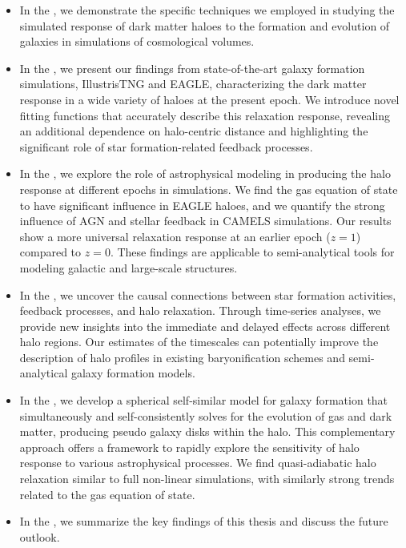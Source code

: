 \begin{itemize}
    \item In the ,  we demonstrate the specific techniques we employed in studying the simulated response of dark matter haloes to the formation and evolution of galaxies in simulations of cosmological volumes.
    
    \item In the , we present our findings from state-of-the-art galaxy formation simulations, IllustrisTNG and EAGLE, characterizing the dark matter response in a wide variety of haloes at the present epoch. We introduce novel fitting functions that accurately describe this relaxation response, revealing an additional dependence on halo-centric distance and highlighting the significant role of star formation-related feedback processes.
    
    \item In the , we explore the role of astrophysical modeling in producing the halo response at different epochs in simulations. We find the gas equation of state to have significant influence in EAGLE haloes, and we quantify the strong influence of AGN and stellar feedback in CAMELS simulations. Our results show a more universal relaxation response at an earlier epoch ($z=1$) compared to $z=0$. These findings are applicable to semi-analytical tools for modeling galactic and large-scale structures.
    
    \item In the , we uncover the causal connections between star formation activities, feedback processes, and halo relaxation. Through time-series analyses, we provide new insights into the immediate and delayed effects across different halo regions. Our estimates of the timescales can potentially improve the description of halo profiles in existing baryonification schemes and semi-analytical galaxy formation models.

    \item In the , we develop a spherical self-similar model for galaxy formation that simultaneously and self-consistently solves for the evolution of gas and dark matter, producing pseudo galaxy disks within the halo. This complementary approach offers a framework to rapidly explore the sensitivity of halo response to various astrophysical processes. We find quasi-adiabatic halo relaxation similar to full non-linear simulations, with similarly strong trends related to the gas equation of state.

    \item In the , we summarize the key findings of this thesis and discuss the future outlook.
\end{itemize}
